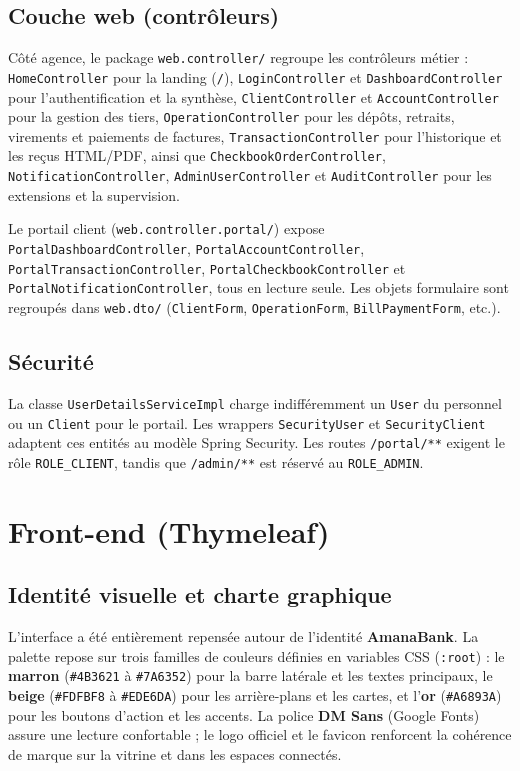 \documentclass[11pt,a4paper,oneside]{report}
\begin{document}
\subsection{Couche web (contrôleurs)}

Côté agence, le package \texttt{web.controller/} regroupe les contrôleurs métier : \texttt{HomeController} pour la landing (\texttt{/}), \texttt{LoginController} et \texttt{DashboardController} pour l'authentification et la synthèse, \texttt{ClientController} et \texttt{AccountController} pour la gestion des tiers, \texttt{OperationController} pour les dépôts, retraits, virements et paiements de factures, \texttt{TransactionController} pour l'historique et les reçus HTML/PDF, ainsi que \texttt{CheckbookOrderController}, \texttt{NotificationController}, \texttt{AdminUserController} et \texttt{AuditController} pour les extensions et la supervision.

Le portail client (\texttt{web.controller.portal/}) expose \texttt{PortalDashboardController}, \texttt{PortalAccountController}, \texttt{PortalTransactionController}, \texttt{PortalCheckbookController} et \texttt{PortalNotificationController}, tous en lecture seule. Les objets formulaire sont regroupés dans \texttt{web.dto/} (\texttt{ClientForm}, \texttt{OperationForm}, \texttt{BillPaymentForm}, etc.).

\subsection{Sécurité}

La classe \texttt{UserDetailsServiceImpl} charge indifféremment un \texttt{User} du personnel ou un \texttt{Client} pour le portail. Les wrappers \texttt{SecurityUser} et \texttt{SecurityClient} adaptent ces entités au modèle Spring Security. Les routes \texttt{/portal/**} exigent le rôle \texttt{ROLE\_CLIENT}, tandis que \texttt{/admin/**} est réservé au \texttt{ROLE\_ADMIN}.

\section{Front-end (Thymeleaf)}

\subsection{Identité visuelle et charte graphique}

L'interface a été entièrement repensée autour de l'identité \textbf{AmanaBank}. La palette repose sur trois familles de couleurs définies en variables CSS (\texttt{:root}) : le \textbf{marron} (\texttt{\#4B3621} à \texttt{\#7A6352}) pour la barre latérale et les textes principaux, le \textbf{beige} (\texttt{\#FDFBF8} à \texttt{\#EDE6DA}) pour les arrière-plans et les cartes, et l'\textbf{or} (\texttt{\#A6893A}) pour les boutons d'action et les accents. La police \textbf{DM Sans} (Google Fonts) assure une lecture confortable ; le logo officiel et le favicon renforcent la cohérence de marque sur la vitrine et dans les espaces connectés.
\end{document}
